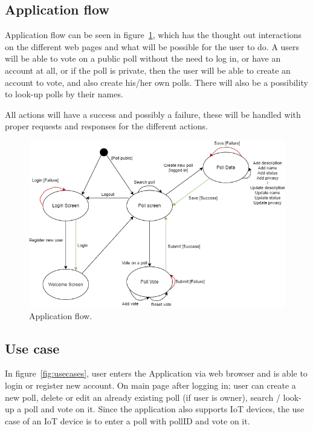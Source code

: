 \subsection{Application flow}
\label{sub:appflow}
Application flow can be seen in figure~\ref{fig:applicationflow}, which has the thought out interactions on the different web pages and what will be possible for the user to do. A users will be able to vote on a public poll without the need to log in, or have an account at all, or if the poll is private, then the user will be able to create an account to vote, and also create his/her own polls. There will also be a possibility to look-up polls by their names.

All actions will have a success and possibly a failure, these will be handled with proper requests and responses for the different actions.
\begin{figure}[H]
  \centering
  \includegraphics[scale=0.45]{figs/applicationflow.png}
  \caption[scale=0.5]{Application flow.}
  \label{fig:applicationflow}
\end{figure}

\subsection{Use case}
\label{sub:usecase}
In figure~\ref{fig:usecases}, user enters the Application via web browser and is able to login or register new account. On main page after logging in; user can create a new poll, delete or edit an already existing poll (if user is owner), search / look-up a poll and vote on it. Since the application also supports IoT devices, the use case of an IoT device is to enter a poll with pollID and vote on it.

